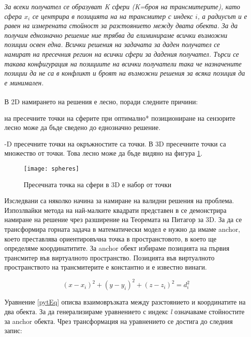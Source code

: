 \textit{За всеки получател се образуват K сфери (K=броя на трансмитерите), като сфера $x_i$ се центрира в позицията на на трансмитер с индекс $i$, а радиусът и е равен на измерената стойност за разстоянието между двата обекта. За да получим еднозначно решение ние трябва да елиминираме всички възможни позиции освен една. Всички решения на задачата за даден получател се намират на пресечния регион на всички сфери за дадения получател. Търси се такава конфигурация на позициите на всички получатели така че назначените позиции да не са в конфликт и броят на възможни решения за всяка позиция да е минимален.}\\\\

В 2D намирането на решения е лесно, поради следните причини:

\begin{enumerate}
     на пресечните точки на сферите при оптимално* позициониране на сензорите лесно може да бъде сведено до еднозначно решение.

    -D пресечните точки на окръжностите са точки. В 3D пресечните точки са множество от точки. Това лесно може да бъде видяно на фигура \ref{spheres}.
\end{enumerate}

\begin{figure}
    \centerline{\texttt{[image: spheres]}}
    \caption{Пресечната точка на сфери в 3D е набор от точки}
    \label{spheres}
\end{figure}

Изследвани са няколко начина за намиране на валидни решения на проблема. Изпозлвайки метода на най-малките квадрати представен в \cite{leastsq} се демонстрира намиране на решение чрез разширение на Теоремата на Питагор за 3D. За да се трансформира горната задача в математически модел е нужно да имаме anchor\cite{leastsq2}, което преставлява ориентировъчна точка в пространстовото, в което ще определяме координатитите. За anchor обект избираме позицията на първия трансмитер във виртуалното пространство. Позицията във виртуалното пространството на трансмитерите е константно и е известно винаги.

\begin{equation} \label{pytEq}
   (x-x_i)^2 + (y-y_i)^2 + (z-z_i)^2=d_i^2
\end{equation}



Уравнение \ref{pytEq} описва взаимовръзката между разстоянието и координатите на два обекта. За да генерализираме уравнението с индекс \textit{l} означаваме стойностите за anchor обекта. Чрез трансформация на уравнението се достига до следния запис:

